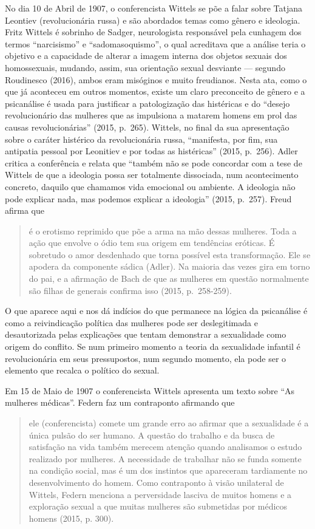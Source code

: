 No dia 10 de Abril de 1907, o conferencista Wittels se põe a falar sobre
Tatjana Leontiev (revolucionária russa) e são abordados temas como
gênero e ideologia. Fritz Wittels é sobrinho de Sadger, neurologista
responsável pela cunhagem dos termos ``narcisismo'' e
``sadomasoquismo'', o qual acreditava que a análise teria o objetivo e a
capacidade de alterar a imagem interna dos objetos sexuais dos
homossexuais, mudando, assim, sua orientação sexual desviante ---
segundo Roudinesco (2016), ambos eram misóginos e muito freudianos.
Nesta ata, como o que já aconteceu em outros momentos, existe um claro
preconceito de gênero e a psicanálise é usada para justificar a
patologização das histéricas e do ``desejo revolucionário das mulheres
que as impulsiona a matarem homens em prol das causas revolucionárias''
(2015, p.~265). Wittels, no final da sua apresentação sobre o caráter histérico
da revolucionária russa, ``manifesta, por fim, sua antipatia pessoal por
Leonitiev e por todas as histéricas'' (2015, p.~256). Adler critica a
conferência e relata que ``também não se pode concordar com a tese de
Wittels de que a ideologia possa ser totalmente dissociada, num
acontecimento concreto, daquilo que chamamos vida emocional ou ambiente.
A ideologia não pode explicar nada, mas podemos explicar a ideologia''
(2015, p.~257). Freud afirma que

\begin{quote}
é o erotismo reprimido que põe a arma na mão dessas mulheres. Toda a
ação que envolve o ódio tem sua origem em tendências eróticas. É
sobretudo o amor desdenhado que torna possível esta transformação. Ele
se apodera da componente sádica (Adler). Na maioria das vezes gira em
torno do pai, e a afirmação de Bach de que as mulheres em questão
normalmente são filhas de generais confirma isso (2015, p.~258-259).
\end{quote}

O que aparece aqui e nos dá indícios do que permanece na lógica da
psicanálise é como a reivindicação política das mulheres pode ser
deslegitimada e desautorizada pelas explicações que tentam demonstrar a
sexualidade como origem do conflito. Se num primeiro momento a teoria da
sexualidade infantil é revolucionária em seus pressupostos, num segundo
momento, ela pode ser o elemento que recalca o político do sexual.

Em 15 de Maio de 1907 o conferencista Wittels apresenta um texto sobre
``As mulheres médicas''. Federn faz um contraponto afirmando que

\begin{quote}
ele (conferencista) comete um grande erro ao afirmar que a sexualidade é
a única pulsão do ser humano. A questão do trabalho e da busca de
satisfação na vida também merecem atenção quando analisamos o estudo
realizado por mulheres. A necessidade de trabalhar não se funda somente
na condição social, mas é um dos instintos que apareceram tardiamente no
desenvolvimento do homem. Como contraponto à visão unilateral de
Wittels, Federn menciona a perversidade lasciva de muitos homens e a
exploração sexual a que muitas mulheres são submetidas por médicos
homens (2015, p. 300).
\end{quote}


